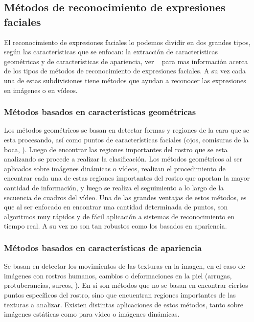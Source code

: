 \subsection{Métodos de reconocimiento de expresiones faciales}
El reconocimiento de expresiones faciales lo podemos dividir en dos grandes tipos, según las características que se enfocan: la extracción de características geométricas y de características de apariencia, ver ~\cite{Pantic2000,Zeng2009} para mas información acerca de los tipos de métodos de reconocimiento de expresiones faciales. A su vez cada una de estas subdivisiones tiene métodos que ayudan a reconocer las expresiones en imágenes o en vídeos.

\subsubsection{Métodos basados en características geométricas}
\label{sec:met_geo}
Los métodos geométricos se basan en detectar formas y regiones de la cara que se esta procesando, así como puntos de características faciales (\eg ojos, comisuras de la boca, \etc). 
Luego de encontrar las regiones importantes del rostro que se esta analizando se procede a realizar la clasificación. Los métodos geométricos al ser aplicados sobre imágenes dinámicas o vídeos, realizan el procedimiento de encontrar cada una de estas regiones importantes del rostro que aportan la mayor cantidad de información, y luego se realiza el seguimiento a lo largo de la secuencia de cuadros del vídeo. Una de las grandes ventajas de estos métodos, es que al ser enfocado en encontrar una cantidad determinada de puntos, son algoritmos muy rápidos y de fácil aplicación a sistemas de reconocimiento en tiempo real. A su vez no son tan robustos como los basados en apariencia.


\subsubsection{Métodos basados en características de apariencia}
\label{sec:met_apa}
Se basan en detectar los movimientos de las texturas en la imagen, en el caso de imágenes con rostros humanos, cambios o deformaciones en la piel (\eg arrugas, protuberancias, surcos, \etc). En si son métodos que no se basan en encontrar ciertos puntos específicos del rostro, sino que encuentran regiones importantes de las texturas a analizar. Existen distintas aplicaciones de estos métodos, tanto sobre imágenes estáticas como para vídeo o imágenes dinámicas.  

